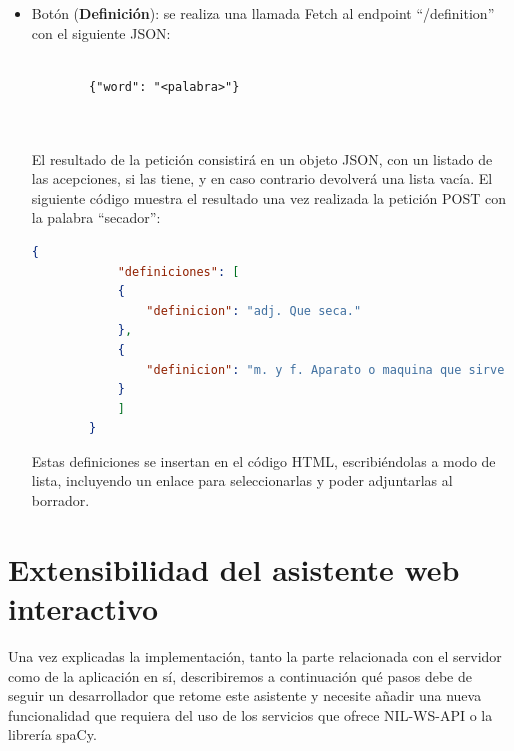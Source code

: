 \begin{itemize}
	\item Botón (\textbf{Definición}): se realiza una llamada Fetch al endpoint ``/definition'' con el siguiente JSON:
		\begin{lstlisting}
		
		{"word": "<palabra>"}
		
		
	\end{lstlisting}
	
	 El resultado de la petición consistirá en un objeto JSON, con un listado de las acepciones, si las tiene, y en caso contrario devolverá una lista vacía. El siguiente código muestra el resultado una vez realizada la petición POST con la palabra ``secador'':
	 	\begin{lstlisting}[language=json,firstnumber=1]
	 	{
	 		"definiciones": [
	 		{
	 			"definicion": "adj. Que seca."
	 		},
	 		{
	 			"definicion": "m. y f. Aparato o maquina que sirve para secar."
	 		}
	 		]
	 	}
	 \end{lstlisting}
	Estas definiciones se insertan en el código HTML, escribiéndolas a modo de lista, incluyendo un enlace para seleccionarlas y poder adjuntarlas al borrador.    
	




\end{itemize}


\section{Extensibilidad del asistente web interactivo}
Una vez explicadas la implementación, tanto la parte relacionada con el servidor como de la aplicación en sí, describiremos a continuación qué pasos debe de seguir un desarrollador que retome este asistente y necesite añadir una nueva funcionalidad que requiera del uso de los servicios que ofrece NIL-WS-API o la librería spaCy.

